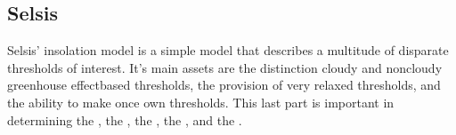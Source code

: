 \documentclass[letterpaper,10pt,english]{sphinxmanual}
\begin{document}
\subsection{Selsis}
\label{\detokenize{quantities/insolation_models/selsis/selsis:selsis}}\label{\detokenize{quantities/insolation_models/selsis/selsis::doc}}\label{\detokenize{quantities/insolation_models/selsis/selsis:selsis-insolation-model}}
\sphinxAtStartPar
Selsis’ insolation model is a simple model that describes a multitude of
disparate thresholds of interest.
It’s main assets are the distinction cloudy and non\sphinxhyphen{}cloudy greenhouse effect\sphinxhyphen{}based thresholds,
the provision of very relaxed thresholds, and the ability to make once own thresholds. This last part
is important in determining the {\hyperref[\detokenize{quantities/children_orbit_limits/inner_rock_formation_limit:id1}]{}},
the {\hyperref[\detokenize{quantities/children_orbit_limits/outer_rock_formation_limit:id1}]{}},
the {\hyperref[\detokenize{quantities/children_orbit_limits/inner_water_frost_limit:id1}]{}},
the {\hyperref[\detokenize{quantities/children_orbit_limits/sol_equivalent_water_frost_limit:id1}]{}},
and the {\hyperref[\detokenize{quantities/children_orbit_limits/outer_water_frost_limit:id1}]{}}.
\end{document}
